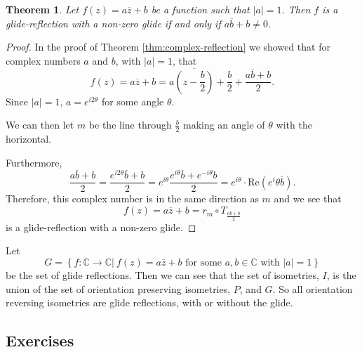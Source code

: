 \documentclass[
]{book}
\newtheorem{theorem}{Theorem}[chapter]
\theoremstyle{definition}
\theoremstyle{definition}
\theoremstyle{definition}
\theoremstyle{definition}
\theoremstyle{remark}
\begin{document}
\begin{theorem}
Let \(f(z)=a\overline{z} + b\) be a function such that \(|a|=1\). Then \(f\) is a glide-reflection with a non-zero glide if and only if \(a\overline{b}+b\neq 0\).
\end{theorem}

\begin{proof}
In the proof of Theorem \ref{thm:complex-reflection} we showed that for complex numbers \(a\) and \(b\), with \(|a|=1\), that
\[f(z)=a\overline{z}+b =  a \overline{ \left( z-\frac{b}{2}\right)} + \frac{b}{2} + \frac{a\overline{b}+b}{2}.\]
Since \(|a|=1\), \(a = e^{i2 \theta}\) for some angle \(\theta\).

We can then let \(m\) be the line through \(\frac{b}{2}\) making an angle of \(\theta\) with the horizontal.

Furthermore,
\[\frac{a\overline{b}+b}{2} = \frac{e^{i2\theta}\overline{b} + b}{2} = e^{i\theta} \frac{ e^{i \theta} \overline{b} + e^{-i\theta} b}{2} = e^{i \theta} \cdot \mbox{Re}\left( e^i \theta \overline{b}\right).\]
Therefore, this complex number is in the same direction as \(m\) and we see that
\[f(z)=a \overline{z} + b = r_m \circ T_{\frac{a\overline{b}+b}{2}}\] is a glide-reflection with a non-zero glide.
\end{proof}

Let
\[G = \left\{ f : \mathbb{C} \rightarrow \mathbb{C} \vert \: f(z)= a \overline{z}+b \mbox{ for some } a,b\in \mathbb{C} \mbox{ with } |a|=1 \right\}\] be the set of glide reflections. Then we can see that the set of isometries, \(I\), is the union of the set of orientation preserving isometries, \(P\), and \(G\). So all orientation reversing isometries are glide reflections, with or without the glide.

\hypertarget{exercises-56}{%
\subsection{Exercises}\label{exercises-56}}
\end{document}
